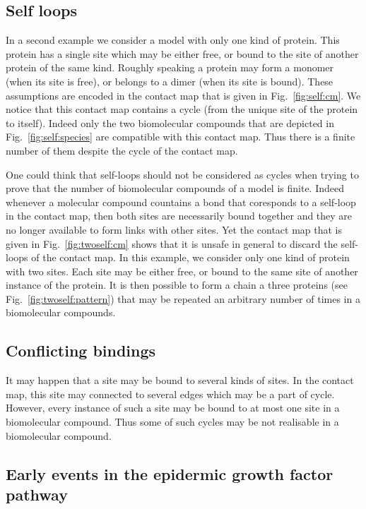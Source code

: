 \documentclass{entcs}
\begin{document}
\subsection{Self loops}

In a second example we consider a model with only one kind of protein. This protein has a single site which may be either free, or bound to the site of another protein of the same kind. Roughly speaking a protein may form a monomer (when its site is free), or belongs to a dimer (when its site is bound). These assumptions are encoded in the contact map that is given in Fig.~\ref{fig:self:cm}. We notice that this contact map contains a cycle (from the unique site of the protein to itself). Indeed only the two biomolecular compounds that are depicted in Fig.~\ref{fig:self:species} are compatible with this contact map. Thus there is a finite number of them despite the cycle of the contact map.

One could think that self-loops should not be considered as cycles when trying to prove that the number of biomolecular compounds of a model is finite. Indeed whenever a molecular compound countains a bond that coresponds to a self-loop in the contact map, then both sites are necessarily  bound together and they are no longer available to form links with other sites. Yet the contact map that is given in Fig.~\ref{fig:twoself:cm} shows that it is unsafe in general  to discard the self-loops of the contact map. In this example, we consider only one kind of protein with two sites. Each site may be either free, or bound to the same site of another instance of the protein. It is then possible to form a chain a three proteins (see Fig.~\ref{fig:twoself:pattern}) that may be repeated an arbitrary number of times in a biomolecular compounds.

\subsection{Conflicting bindings}

It may happen that a site may be bound to several kinds of sites.
In the contact map, this site may connected to several edges which may be a part of cycle. However, every instance of such a site may be bound to at most
one site in a biomolecular compound. Thus some of such cycles may be not realisable in a biomolecular compound.



\subsection{Early events in the epidermic growth factor pathway}
\end{document}
